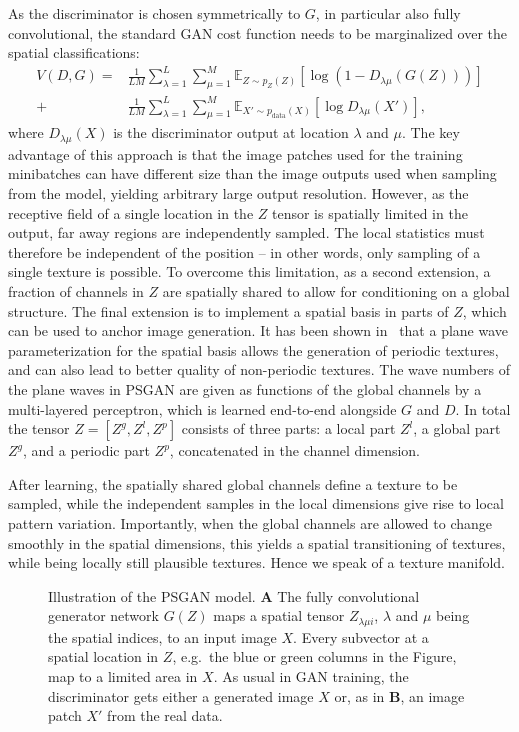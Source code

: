 \documentclass{article}
\begin{document}
As the discriminator is chosen symmetrically to $G$, in particular also fully convolutional, the standard GAN cost function needs to be marginalized over the spatial classifications:
\begin{align}
V(D,G) =& \frac{1}{LM} \sum_{\lambda=1}^L \sum_{\mu=1}^M \mathbb{E}_{Z \sim p_Z(Z)} \left[ \log \left( 1 - D_{\lambda\mu}(G(Z)) \right) \right]  \nonumber \\
  +& \frac{1}{LM} \sum_{\lambda=1}^{L} \sum_{\mu=1}^{M} \mathbb{E}_{X' \sim p_{\mathrm{data}}(X)} \left[ \log D_{\lambda\mu}(X') \right],
  \label{eq:pgan_vfunc}
\end{align}
where $D_{\lambda\mu}(X)$ is the discriminator output at location $\lambda$ and $\mu$.
The key advantage of this approach is that the image patches used for the training minibatches can have different size than the image outputs used when sampling from the model, yielding arbitrary large output resolution. However, as the receptive field of a single location in the $Z$ tensor is spatially limited in the output, far away regions are independently sampled. The local statistics must therefore be independent of the position -- in other words, only sampling of a single texture is possible. To overcome this limitation, as a second extension, a fraction of channels in $Z$ are spatially shared to allow for conditioning on a global structure. 
The final extension is to implement a spatial basis in parts of $Z$, which can be used to anchor image generation. It has been shown in~\cite{PSGAN2017} that a plane wave parameterization for the spatial basis allows the generation of periodic textures, and can also lead to better quality of non-periodic textures. The wave numbers of the plane waves in PSGAN are given as functions of the global channels by a multi-layered perceptron, which is learned end-to-end alongside $G$ and $D$. 
In total the tensor $Z= [Z^g,Z^l,Z^p]$ consists of three parts: a local part $Z^l$, a global part $Z^g$, and a periodic part $Z^p$, concatenated in the channel dimension.

After learning, the spatially shared global channels define a texture to be sampled, while the independent samples in the local dimensions give rise to local pattern variation. Importantly, when the global channels are allowed to change smoothly in the spatial dimensions, this yields a spatial transitioning of textures, while being locally still plausible textures. Hence we speak of a texture manifold.

\begin{figure*}[tb]
 \caption{Illustration of the PSGAN model. \textbf{A} The fully convolutional generator network $G(Z)$ maps a spatial tensor $Z_{\lambda \mu i}$, $\lambda$ and $\mu$ being the spatial indices, to an input image $X$. Every subvector at a spatial location in $Z$, e.g.\ the blue or green columns in the Figure, map to a limited area in $X$. As usual in GAN training, the discriminator gets either a generated image $X$ or, as in \textbf{B}, an image patch $X'$ from the real data.}
  \label{fig:PSGAN}
\end{figure*}
\end{document}
